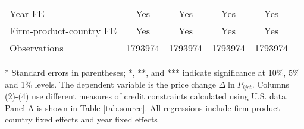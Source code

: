 \documentclass[12pt]{article}
\begin{document}
\begin{table}[htbp]
\begin{threeparttable}
\begin{tabular}{lcccc}
			Year FE  & Yes   & Yes   & Yes   & Yes \\
			Firm-product-country FE & Yes   & Yes   & Yes   & Yes \\
			Observations & 1793974 & 1793974 & 1793974 & 1793974 \\
			\bottomrule
		\end{tabular}
		\begin{tablenotes}
			\footnotesize
			\item[*] Standard errors in parentheses; *, **, and *** indicate significance at 10\%, 5\% and 1\% levels. The dependent variable is the price change $\Delta \ln P_{ijct}$. Columns (2)-(4) use different measures of credit constraints calculated using U.S. data. Panel A is shown in Table \ref{tab.source}. All regressions include firm-product-country fixed effects and year fixed effects
		\end{tablenotes}
	\end{threeparttable}
	\label{tabA.1}
\end{table}
\end{document}
